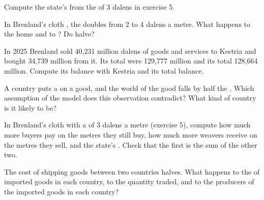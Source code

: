\begin{exercise}[$\star\star$]\label{exo:g9:international-trade:6}
Compute the state's  from the  of 3 dalens in exercise 5.
\end{exercise}

\begin{exercise}[$\star\star$]\label{exo:g9:international-trade:7}
In Brenland's cloth , the  doubles from 2 to 4 dalens a metre. What happens to the home 
and to ? Do  halve?
\end{exercise}

\begin{exercise}[$\star\star$]\label{exo:g9:international-trade:8}
In 2025 Brenland sold 40,231 million dalens of goods and services to Kestria and bought 34,739 million from
it. Its total  were 129,777 million and its total  128,664 million. Compute its balance with
Kestria and its total balance.
\end{exercise}

\begin{exercise}[$\star\star$]\label{exo:g9:international-trade:9}
A country puts a  on a good, and the world  of the good falls by half the . Which
assumption of the  model does this observation contradict? What kind of country is it likely to
be?
\end{exercise}

\begin{exercise}[$\star\star\star$]\label{exo:g9:international-trade:10}
In Brenland's cloth  with a  of 3 dalens a metre (exercise 5), compute how much more buyers pay
on the metres they still buy, how much more weavers receive on the metres they sell, and the state's
. Check that the first is the sum of the other two.
\end{exercise}

\begin{exercise}[$\star\star\star$]\label{exo:g9:international-trade:11}
The cost of shipping goods between two countries halves. What happens to the  of imported goods in
each country, to the quantity traded, and to the producers of the imported goods in each country?
\end{exercise}

